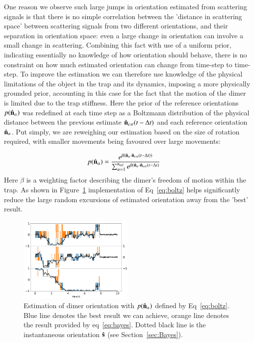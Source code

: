 \documentclass[final,  3p]{elsarticle}
\begin{document}
One reason we observe such large jumps in orientation estimated from scattering signals is that there is no simple correlation between the 'distance in scattering space' between scattering signals from two different orientations, and their separation in orientation space: even a large change in orientation can involve a small change in scattering. Combining this fact with use of a uniform prior, indicating essentially no knowledge of how orientation should behave, there is no constraint on how much estimated orientation can change from time-step to time-step. To improve the estimation we can therefore use knowledge of the physical limitations of the object in the trap and its dynamics, imposing a more physically grounded prior, accounting in this case for the fact that the motion of the dimer is limited due to the trap stiffness. Here the prior of the reference orientations $p(\hat{\bf n}_\alpha)$ was redefined at each time step as a Boltzmann distribution of the physical distance between the previous estimate $\hat{\bf n}_{est}(t-\Delta t)$ and each reference orientation $\hat{\bf n}_\alpha$. Put simply, we are reweighing our estimation based on the size of rotation required, with smaller movements being favoured over large movements:

\begin{align}
  p(\hat{\bf n}_\alpha)
  &=\frac{e^{\beta (\hat{\bf n}_\alpha 
  	\cdot \hat{\bf n}_{est}(t-\Delta t))}}
  {\sum_{\alpha=1}^{n_{\rm ref}}
	e^{\beta (\hat{\bf n}_\alpha 
	\cdot \hat{\bf n}_{est}(t-\Delta t)}}
	\label{eq:boltz}
\end{align}
Here $\beta$ is a weighting factor describing the dimer's freedom of motion within the trap. As shown in Figure~\ref{fig:biased} implementation of Eq~\eqref{eq:boltz} helps significantly reduce the large random excursions of estimated orientation away from the 'best' result. 

\begin{figure}[h]
\centering
\includegraphics[width=0.5\textwidth]{./Images/fig8a.png}
\caption{\label{fig:biased}
%
Estimation of dimer orientation with $p(\hat{\bf n}_\alpha)$ defined
by Eq~\eqref{eq:boltz}.  Blue line denotes the best result we can
achieve, orange line denotes the result provided by eq~\ref{eq:bayes}.
Dotted black line is the instantaneous orientation $\hat{\bf s}$ (see Section~\ref{sec:Bayes}).
}
\end{figure} 
\end{document}
